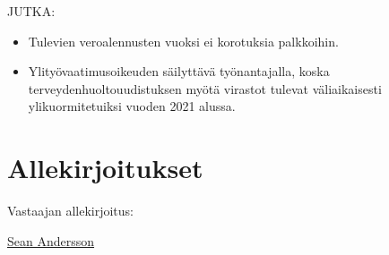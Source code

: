 \documentclass{article}
\begin{document}
	\vspace{12pt}
	JUTKA:
	\begin{itemize}
		\item Tulevien veroalennusten vuoksi ei korotuksia palkkoihin.
		\item Ylityövaatimusoikeuden säilyttävä työnantajalla, koska terveydenhuoltouudistuksen myötä virastot tulevat väliaikaisesti ylikuormitetuiksi vuoden 2021 alussa.
	\end{itemize}
	
	\section{Allekirjoitukset}
	\vspace{12pt}
	Vastaajan allekirjoitus:
	
	\underline{Sean Andersson}
	
	
\end{document}
